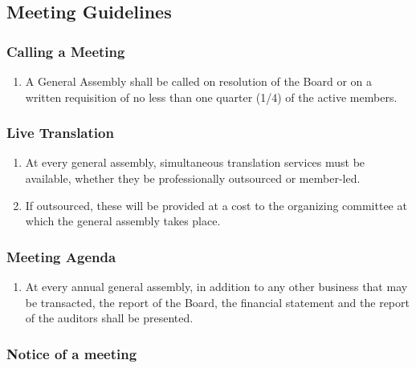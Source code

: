 \subsection{Meeting Guidelines}
\label{meeting-guidelines}

\subsubsection{Calling a Meeting}
\label{calling-a-meeting}

\begin{enumerate}
 \item
  A General Assembly shall be called on resolution of the Board or on a written requisition of no less than one quarter (1/4) of the active members.
\end{enumerate}

\subsubsection{Live Translation}
\label{live-translation}

\begin{enumerate}
 \item
  At every general assembly, simultaneous translation services must be available, whether they be professionally outsourced or member-led.
 \item
  If outsourced, these will be provided at a cost to the organizing committee at which the general assembly takes place.
\end{enumerate}

\subsubsection{Meeting Agenda}
\label{meeting-agenda}

\begin{enumerate}
 \item
  At every annual general assembly, in addition to any other business that may be transacted, the report of the Board, the financial statement and the report of the auditors shall be presented.
\end{enumerate}

\subsubsection{Notice of a meeting}
\label{notice-of-a-meeting}

